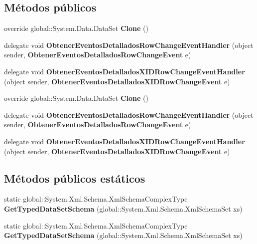 \subsection*{Métodos públicos}
\begin{DoxyCompactItemize}
\item 
override global\+::\+System.\+Data.\+Data\+Set {\bfseries Clone} ()\label{class_resa___pro_1_1_resa_d_b_data_set_af7904923271593ff532084260454e656}

\item 
delegate void {\bfseries Obtener\+Eventos\+Detallados\+Row\+Change\+Event\+Handler} (object sender, {\bf Obtener\+Eventos\+Detallados\+Row\+Change\+Event} e)\label{class_resa___pro_1_1_resa_d_b_data_set_a7a78a3c692edba6fb96be693eccf28b9}

\item 
delegate void {\bfseries Obtener\+Eventos\+Detallados\+X\+I\+D\+Row\+Change\+Event\+Handler} (object sender, {\bf Obtener\+Eventos\+Detallados\+X\+I\+D\+Row\+Change\+Event} e)\label{class_resa___pro_1_1_resa_d_b_data_set_ae60c6dc2bc58d13bd192172aaf163c76}

\item 
override global\+::\+System.\+Data.\+Data\+Set {\bfseries Clone} ()\label{class_resa___pro_1_1_resa_d_b_data_set_af7904923271593ff532084260454e656}

\item 
delegate void {\bfseries Obtener\+Eventos\+Detallados\+Row\+Change\+Event\+Handler} (object sender, {\bf Obtener\+Eventos\+Detallados\+Row\+Change\+Event} e)\label{class_resa___pro_1_1_resa_d_b_data_set_a7a78a3c692edba6fb96be693eccf28b9}

\item 
delegate void {\bfseries Obtener\+Eventos\+Detallados\+X\+I\+D\+Row\+Change\+Event\+Handler} (object sender, {\bf Obtener\+Eventos\+Detallados\+X\+I\+D\+Row\+Change\+Event} e)\label{class_resa___pro_1_1_resa_d_b_data_set_ae60c6dc2bc58d13bd192172aaf163c76}

\end{DoxyCompactItemize}
\subsection*{Métodos públicos estáticos}
\begin{DoxyCompactItemize}
\item 
static global\+::\+System.\+Xml.\+Schema.\+Xml\+Schema\+Complex\+Type {\bfseries Get\+Typed\+Data\+Set\+Schema} (global\+::\+System.\+Xml.\+Schema.\+Xml\+Schema\+Set xs)\label{class_resa___pro_1_1_resa_d_b_data_set_a456f7d874acfa80f5919b9d125d3696b}

\item 
static global\+::\+System.\+Xml.\+Schema.\+Xml\+Schema\+Complex\+Type {\bfseries Get\+Typed\+Data\+Set\+Schema} (global\+::\+System.\+Xml.\+Schema.\+Xml\+Schema\+Set xs)\label{class_resa___pro_1_1_resa_d_b_data_set_a456f7d874acfa80f5919b9d125d3696b}

\end{DoxyCompactItemize}
